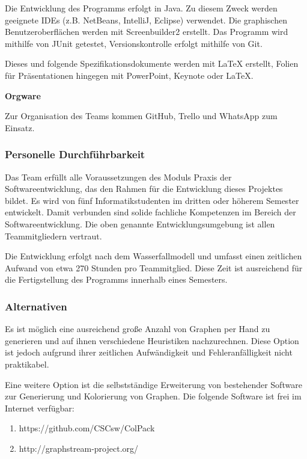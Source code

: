 \documentclass{article}
\begin{document}
	Die Entwicklung des Programms erfolgt in Java. Zu diesem Zweck werden geeignete IDEs (z.B. NetBeans, IntelliJ, Eclipse) verwendet. Die graphischen Benutzeroberflächen werden mit Screenbuilder2 erstellt. Das Programm wird mithilfe von JUnit getestet, Versionskontrolle erfolgt mithilfe von Git.
	
	Dieses und folgende Spezifikationsdokumente werden mit LaTeX erstellt, Folien für Präsentationen hingegen mit PowerPoint, Keynote oder LaTeX.
	\newline
	
	\textbf{Orgware}
	
	Zur Organisation des Teams kommen GitHub, Trello und WhatsApp zum Einsatz.
	
	\subsubsection{Personelle Durchführbarkeit}
	Das Team erfüllt alle Voraussetzungen des Moduls Praxis der Softwareentwicklung, das den Rahmen für die Entwicklung dieses Projektes bildet. Es wird von fünf Informatikstudenten im dritten oder höherem Semester entwickelt. Damit verbunden sind solide fachliche Kompetenzen im Bereich der Softwareentwicklung. Die oben genannte Entwicklungsumgebung ist allen Teammitgliedern vertraut.
	
	Die Entwicklung erfolgt nach dem Wasserfallmodell und umfasst einen zeitlichen Aufwand von etwa 270 Stunden pro Teammitglied. Diese Zeit ist ausreichend für die Fertigstellung des Programms innerhalb eines Semesters.
	
	
	\subsubsection{Alternativen}
	Es ist möglich eine ausreichend große Anzahl von Graphen per Hand zu generieren und auf ihnen verschiedene Heuristiken nachzurechnen. Diese Option ist jedoch aufgrund ihrer zeitlichen Aufwändigkeit und Fehleranfälligkeit nicht praktikabel.
	
	Eine weitere Option ist die selbstständige Erweiterung von bestehender Software zur Generierung und Kolorierung von Graphen. Die folgende Software ist frei im Internet verfügbar:
	\begin{enumerate}[--]
		\item{https://github.com/CSCsw/ColPack}
		\item{http://graphstream-project.org/}
	\end{enumerate}
	
\end{document}
